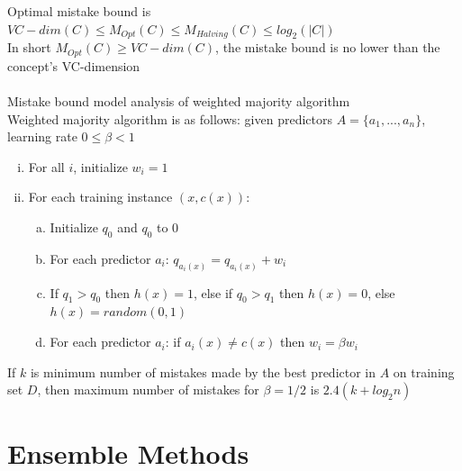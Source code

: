 \documentclass{article}
\begin{document}
			Optimal mistake bound is $VC-dim(C) \leq M_{Opt}(C) \leq M_{Halving}(C) \leq log_2(|C|)$ \\
			In short $M_{Opt}(C) \geq VC-dim(C)$, the mistake bound is no lower than the concept's VC-dimension \\
			\\
			Mistake bound model analysis of weighted majority algorithm \\
			Weighted majority algorithm is as follows: given predictors $A = \{a_1, ..., a_n\}$, learning rate $0 \leq \beta < 1$
			\begin{enumerate}[(i)]
				\item For all $i$, initialize $w_i = 1$
				\item For each training instance $(x, c(x))$:
				\begin{enumerate}[(a)]
					\item Initialize $q_0$ and $q_0$ to 0
					\item For each predictor $a_i$: $q_{a_i(x)} = q_{a_i(x)} + w_i$
					\item If $q_1 > q_0$ then $h(x) = 1$, else if $q_0 > q_1$ then $h(x) = 0$, else $h(x) = random(0, 1)$
					\item For each predictor $a_i$: if $a_i(x) \neq c(x)$ then $w_i = \beta w_i$
					\end{enumerate}
				\end{enumerate}
			If $k$ is minimum number of mistakes made by the best predictor in $A$ on training set $D$, then maximum number of mistakes for $\beta = 1/2$ is $2.4(k + log_2 n)$
		\clearpage

	\section{Ensemble Methods}
\end{document}
